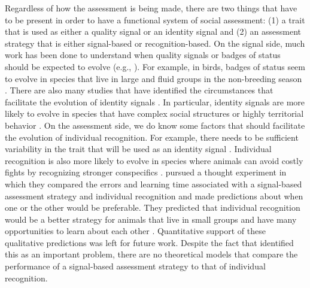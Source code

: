 Regardless of how the assessment is being made, there are two things that have to be present in order to have a functional system of social assessment: (1) a trait that is used as either a quality signal or an identity signal and (2) an assessment strategy that is either signal-based or recognition-based.  On the signal side, much work has been done to understand when quality signals or badges of status should be expected to evolve (e.g., \citep{Whitfield:1987tg,Rohwer:1975fk,Rohwer:1982fk,Dawkins:1991ly,Johnstone:1995vn,Lachmann:1998fk,Tibbetts:2009kx}). For example, in birds, badges of status seem to evolve in species that live in large and fluid groups in the non-breeding season \citep{Tibbetts:2009kx}. There are also many studies that have identified the circumstances that facilitate the evolution of identity signals \citep{Rohwer:1975fk,Whitfield:1987tg,Sheehan:2009we,Pollard:2011te,Sheehan:2014fk}. In particular, identity signals are more likely to evolve in species that have complex social structures or highly territorial behavior \citep{Tibbetts2007IndividualDifferent}. On the assessment side, we do know some factors that should facilitate the evolution of individual recognition. For example, there needs to be sufficient variability in the trait that will be used as an identity signal \citep{Sheehan:2014fk}. Individual recognition is also more likely to evolve in species where animals can avoid costly fights by recognizing stronger conspecifics \citep{DEttorre:2005nu}.  \citet{sheehan2016evotradeoff} pursued a thought experiment in which they compared the errors and learning time associated with a signal-based assessment strategy and individual recognition and made predictions about when one or the other would be preferable. They predicted that individual recognition would be a better strategy for animals that live in small groups and have many opportunities to learn about each other \citep{sheehan2016evotradeoff}. Quantitative support of these qualitative predictions was left for future work. Despite the fact that \citet{sheehan2016evotradeoff} identified this as an important problem, there are no theoretical models that compare the performance of a signal-based assessment strategy to that of individual recognition. 

